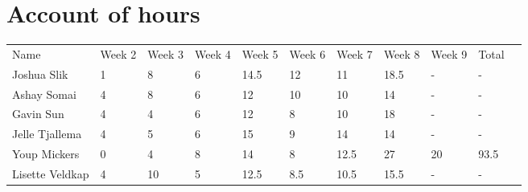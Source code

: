 \chapter{Account of hours}

\begin{table}[h]
\begin{tabular}{| l | l | l | l | l | l | l | l | l | l | l}
 Name & Week 2 & Week 3 & Week 4 & Week 5 & Week 6 & Week 7 & Week 8 & Week 9 & Total & \\
 Joshua Slik & 1 & 8 & 6 & 14.5 & 12 & 11 & 18.5 & - & - & \\
 Ashay Somai & 4 & 8 & 6 & 12 & 10 & 10 & 14 & - & - & \\
 Gavin Sun & 4 & 4 & 6 & 12 & 8 & 10 & 18 & - & - & \\
 Jelle Tjallema & 4 & 5 & 6 & 15 & 9 & 14 & 14 & - & - & \\
 Youp Mickers & 0 & 4 & 8 & 14 & 8 & 12.5 & 27 & 20 & 93.5 & \\
 Lisette Veldkap & 4 & 10 & 5 & 12.5 & 8.5 & 10.5 & 15.5 & - & - & \\
\end{tabular}
\end{table}
